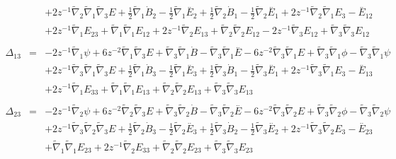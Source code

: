 \documentclass[10pt,letterpaper]{article}
\numberwithin{equation}{section}
\begin{document}
\begin{eqnarray}
&& + 2 z^{-1} \tilde{\nabla}_{2}\tilde{\nabla}_{1}\tilde{\nabla}_{3}E+\tfrac{1}{2} \tilde{\nabla}_{1}\dot{B}_{2} -  \tfrac{1}{2} \tilde{\nabla}_{1}\overset{..}{E}_{2} + \tfrac{1}{2} \tilde{\nabla}_{2}\dot{B}_{1} -  \tfrac{1}{2} \tilde{\nabla}_{2}\overset{..}{E}_{1} + 2 z^{-1} \tilde{\nabla}_{2}\tilde{\nabla}_{1}E_{3}- \overset{..}{E}_{12} \nonumber \\ 
&& + 2 z^{-1} \tilde{\nabla}_{1}E_{23} + \tilde{\nabla}_{1}\tilde{\nabla}_{1}E_{12} + 2 z^{-1} \tilde{\nabla}_{2}E_{13} + \tilde{\nabla}_{2}\tilde{\nabla}_{2}E_{12} - 2 z^{-1} \tilde{\nabla}_{3}E_{12} + \tilde{\nabla}_{3}\tilde{\nabla}_{3}E_{12}
\\  \nonumber\\ 
\Delta_{13}&=& -2 z^{-1} \tilde{\nabla}_{1}\psi + 6 z^{-2} \tilde{\nabla}_{1}\tilde{\nabla}_{3}E + \tilde{\nabla}_{3}\tilde{\nabla}_{1}\dot{B} -  \tilde{\nabla}_{3}\tilde{\nabla}_{1}\overset{..}{E} - 6 z^{-2} \tilde{\nabla}_{3}\tilde{\nabla}_{1}E + \tilde{\nabla}_{3}\tilde{\nabla}_{1}\phi -  \tilde{\nabla}_{3}\tilde{\nabla}_{1}\psi \nonumber \\ 
&& + 2 z^{-1} \tilde{\nabla}_{3}\tilde{\nabla}_{1}\tilde{\nabla}_{3}E+\tfrac{1}{2} \tilde{\nabla}_{1}\dot{B}_{3} -  \tfrac{1}{2} \tilde{\nabla}_{1}\overset{..}{E}_{3} + \tfrac{1}{2} \tilde{\nabla}_{3}\dot{B}_{1} -  \tfrac{1}{2} \tilde{\nabla}_{3}\overset{..}{E}_{1} + 2 z^{-1} \tilde{\nabla}_{3}\tilde{\nabla}_{1}E_{3}- \overset{..}{E}_{13} \nonumber \\ 
&& + 2 z^{-1} \tilde{\nabla}_{1}E_{33} + \tilde{\nabla}_{1}\tilde{\nabla}_{1}E_{13} + \tilde{\nabla}_{2}\tilde{\nabla}_{2}E_{13} + \tilde{\nabla}_{3}\tilde{\nabla}_{3}E_{13}
\\  \nonumber\\ 
\Delta_{23}&=& -2 z^{-1} \tilde{\nabla}_{2}\psi + 6 z^{-2} \tilde{\nabla}_{2}\tilde{\nabla}_{3}E + \tilde{\nabla}_{3}\tilde{\nabla}_{2}\dot{B} -  \tilde{\nabla}_{3}\tilde{\nabla}_{2}\overset{..}{E} - 6 z^{-2} \tilde{\nabla}_{3}\tilde{\nabla}_{2}E + \tilde{\nabla}_{3}\tilde{\nabla}_{2}\phi -  \tilde{\nabla}_{3}\tilde{\nabla}_{2}\psi \nonumber \\ 
&& + 2 z^{-1} \tilde{\nabla}_{3}\tilde{\nabla}_{2}\tilde{\nabla}_{3}E+\tfrac{1}{2} \tilde{\nabla}_{2}\dot{B}_{3} -  \tfrac{1}{2} \tilde{\nabla}_{2}\overset{..}{E}_{3} + \tfrac{1}{2} \tilde{\nabla}_{3}\dot{B}_{2} -  \tfrac{1}{2} \tilde{\nabla}_{3}\overset{..}{E}_{2} + 2 z^{-1} \tilde{\nabla}_{3}\tilde{\nabla}_{2}E_{3}- \overset{..}{E}_{23} \nonumber \\ 
&& + \tilde{\nabla}_{1}\tilde{\nabla}_{1}E_{23} + 2 z^{-1} \tilde{\nabla}_{2}E_{33} + \tilde{\nabla}_{2}\tilde{\nabla}_{2}E_{23} + \tilde{\nabla}_{3}\tilde{\nabla}_{3}E_{23}

\end{eqnarray}
\end{document}
